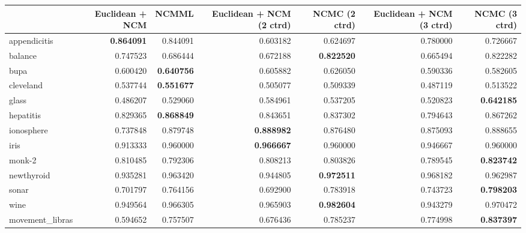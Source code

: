 \begin{tabular}{lrrrrrr}
\toprule
{} &  Euclidean + NCM &     NCMML &  Euclidean + NCM (2 ctrd) &  NCMC (2 ctrd) &  Euclidean + NCM (3 ctrd) &  NCMC (3 ctrd) \\
\midrule
appendicitis    &         \textbf{0.864091} &  0.844091 &                  0.603182 &       0.624697 &                  0.780000 &       0.726667 \\
balance         &         0.747523 &  0.686444 &                  0.672188 &       \textbf{0.822520} &                  0.665494 &       0.822282 \\
bupa            &         0.600420 &  \textbf{0.640756} &                  0.605882 &       0.626050 &                  0.590336 &       0.582605 \\
cleveland       &         0.537744 &  \textbf{0.551677} &                  0.505077 &       0.509339 &                  0.487119 &       0.513522 \\
glass           &         0.486207 &  0.529060 &                  0.584961 &       0.537205 &                  0.520823 &       \textbf{0.642185} \\
hepatitis       &         0.829365 &  \textbf{0.868849} &                  0.843651 &       0.837302 &                  0.794643 &       0.867262 \\
ionosphere      &         0.737848 &  0.879748 &                  \textbf{0.888982} &       0.876480 &                  0.875093 &       0.888655 \\
iris            &         0.913333 &  0.960000 &                  \textbf{0.966667} &       0.960000 &                  0.946667 &       0.960000 \\
monk-2          &         0.810485 &  0.792306 &                  0.808213 &       0.803826 &                  0.789545 &       \textbf{0.823742} \\
newthyroid      &         0.935281 &  0.963420 &                  0.944805 &       \textbf{0.972511} &                  0.968182 &       0.962987 \\
sonar           &         0.701797 &  0.764156 &                  0.692900 &       0.783918 &                  0.743723 &       \textbf{0.798203} \\
wine            &         0.949564 &  0.966305 &                  0.965903 &       \textbf{0.982604} &                  0.943279 &       0.970472 \\
movement\_libras &         0.594652 &  0.757507 &                  0.676436 &       0.785237 &                  0.774998 &       \textbf{0.837397} \\

\end{tabular}
